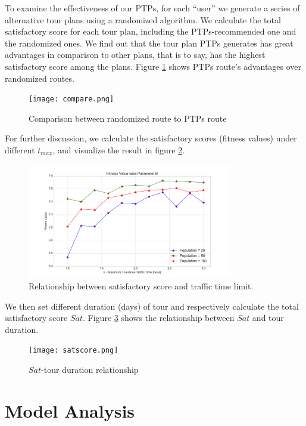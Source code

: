 \documentclass{mcmthesis}
\begin{document}
  To examine the effectiveness of our PTPs, for each ``user'' we generate a series of alternative tour plans using a randomized algorithm. We calculate the total satisfactory score for each tour plan, including the PTPs-recommended one and the randomized ones. We find out that the tour plan PTPs generates has great advantages in comparison to other plans, that is to say, has the highest satisfactory score among the plans. Figure \ref{fig:compare} shows PTPs route's advantages over randomized routes. \par
  \begin{figure}[h]
    \centering
    \texttt{[image: compare.png]}
    \caption{Comparison between randomized route to PTPs route}
    \label{fig:compare}
  \end{figure}
  For further discussion, we calculate the satisfactory scores (fitness values) under different $t_{max}$, and visualize the result in figure \ref{fig:sstt}. \par
  \begin{figure}[h]
    \centering
    \includegraphics[width=0.8\textwidth]{popularity.png}
    \caption{Relationship between satisfactory score and traffic time limit.}
    \label{fig:sstt}
  \end{figure}
  We then set different duration (days) of tour and respectively calculate the total satisfactory score $Sat$. Figure \ref{fig:satscore} shows the relationship between $Sat$ and tour duration. \par
  \begin{figure}[h]
    \centering
    \texttt{[image: satscore.png]}
    \caption{$Sat$-tour duration relationship}
    \label{fig:satscore}
  \end{figure}



\section{Model Analysis}
\end{document}
